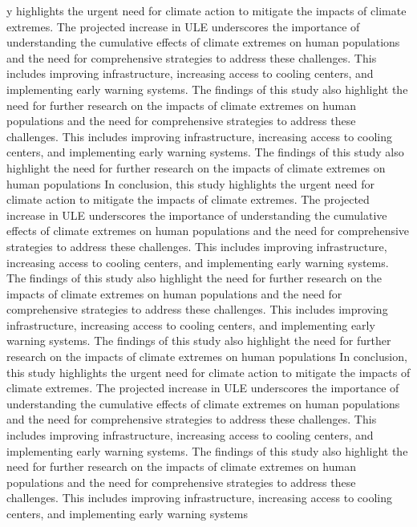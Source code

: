 \documentclass[9pt, twoside]{extarticle}
\begin{document}
\begin{maintext}
y highlights the urgent need for climate action to mitigate the impacts of climate extremes. The projected increase in ULE underscores the importance of understanding the cumulative effects of climate extremes on human populations and the need for comprehensive strategies to address these challenges. This includes improving infrastructure, increasing access to cooling centers, and implementing early warning systems.\cite{IPCC2021} The findings of this study also highlight the need for further research on the impacts of climate extremes on human populations and the need for comprehensive strategies to address these challenges. This includes improving infrastructure, increasing access to cooling centers, and implementing early warning systems.\cite{IPCC2021} The findings of this study also highlight the need for further research on the impacts of climate extremes on human populations  In conclusion, this study highlights the urgent need for climate action to mitigate the impacts of climate extremes. The projected increase in ULE underscores the importance of understanding the cumulative effects of climate extremes on human populations and the need for comprehensive strategies to address these challenges. This includes improving infrastructure, increasing access to cooling centers, and implementing early warning systems.\cite{IPCC2021} The findings of this study also highlight the need for further research on the impacts of climate extremes on human populations and the need for comprehensive strategies to address these challenges. This includes improving infrastructure, increasing access to cooling centers, and implementing early warning systems.\cite{IPCC2021} The findings of this study also highlight the need for further research on the impacts of climate extremes on human populations  In conclusion, this study highlights the urgent need for climate action to mitigate the impacts of climate extremes. The projected increase in ULE underscores the importance of understanding the cumulative effects of climate extremes on human populations and the need for comprehensive strategies to address these challenges. This includes improving infrastructure, increasing access to cooling centers, and implementing early warning systems.\cite{IPCC2021} The findings of this study also highlight the need for further research on the impacts of climate extremes on human populations and the need for comprehensive strategies to address these challenges. This includes improving infrastructure, increasing access to cooling centers, and implementing early warning systems


\end{maintext}
\end{document}
